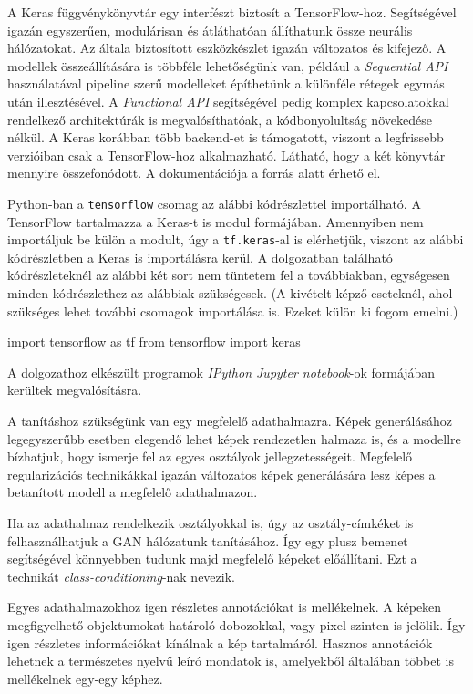A Keras függvénykönyvtár egy interfészt biztosít a TensorFlow-hoz. Segítségével igazán egyszerűen, modulárisan és átláthatóan állíthatunk össze neurális hálózatokat. Az általa biztosított eszközkészlet igazán változatos és kifejező. A modellek összeállítására is többféle lehetőségünk van, például a \textit{Sequential API} használatával pipeline szerű modelleket építhetünk a különféle rétegek egymás után illesztésével. A \textit{Functional API} segítségével pedig komplex kapcsolatokkal rendelkező architektúrák is megvalósíthatóak, a kódbonyolultság növekedése nélkül. A Keras korábban több backend-et is támogatott, viszont a legfrissebb verzióiban csak a TensorFlow-hoz alkalmazható. Látható, hogy a két könyvtár mennyire összefonódott. A dokumentációja a \cite{keras} forrás alatt érhető el.

Python-ban a \texttt{tensorflow} csomag az alábbi kódrészlettel importálható. A TensorFlow tartalmazza a Keras-t is modul formájában. Amennyiben nem importáljuk be külön a modult, úgy a \texttt{tf.keras}-al is elérhetjük, viszont az alábbi kódrészletben a Keras is importálásra kerül. A dolgozatban található kódrészleteknél az alábbi két sort nem tüntetem fel a továbbiakban, egységesen minden kódrészlethez az alábbiak szükségesek. (A kivételt képző eseteknél, ahol szükséges lehet további csomagok importálása is. Ezeket külön ki fogom emelni.)
\begin{python}
import tensorflow as tf
from tensorflow import keras
\end{python}

A dolgozathoz elkészült programok \textit{IPython Jupyter notebook}-ok \cite{jupyter} formájában kerültek megvalósításra.


A tanításhoz szükségünk van egy megfelelő adathalmazra. Képek generálásához legegyszerűbb esetben elegendő lehet képek rendezetlen halmaza is, és a modellre bízhatjuk, hogy ismerje fel az egyes osztályok jellegzetességeit. Megfelelő regularizációs technikákkal igazán változatos képek generálására lesz képes a betanított modell a megfelelő adathalmazon.

Ha az adathalmaz rendelkezik osztályokkal is, úgy az osztály-címkéket is felhasználhatjuk a GAN hálózatunk tanításához. Így egy plusz bemenet segítségével könnyebben tudunk majd megfelelő képeket előállítani. Ezt a technikát \textit{class-conditioning}-nak nevezik.

Egyes adathalmazokhoz igen részletes annotációkat is mellékelnek. A képeken megfigyelhető objektumokat határoló dobozokkal, vagy pixel szinten is jelölik. Így igen részletes információkat kínálnak a kép tartalmáról. Hasznos annotációk lehetnek a természetes nyelvű leíró mondatok is, amelyekből általában többet is mellékelnek egy-egy képhez.

